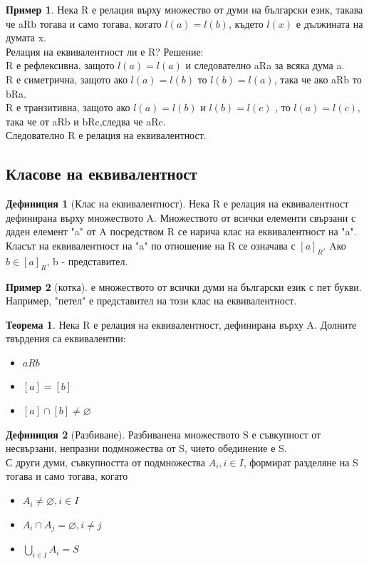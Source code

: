 \documentclass[fleqn, 12pt]{article}
\theoremstyle{definition}
\newtheorem{example}{Пример}[subsection]
\newtheorem{definition}{Дефиниция}[subsection]
\newtheorem{theorem}{Теорема}[subsection]
\begin{document}
\begin{example}
Нека R е релация върху множество от думи на български език, такава че aRb тогава и само тогава, когато $l(a) = l(b)$, където $l(x)$ е дължината на думата x.\\
Релация на еквивалентност ли е R?
Решение: \\
R е рефлексивна, защото $l(a) = l(a)$ и следователно aRa за всяка дума a.\\
R е симетрична, защото ако $l(a) = l(b)$ то $l(b) = l(a)$, така че ако aRb то bRa.\\
R е транзитивна, защото ако $l(a) = l(b)$ и $l(b) = l(c)$ , то $l(a) = l(c)$, така че от aRb и bRc,следва че aRc.\\
Следователно R е релация на еквивалентност.
\end{example}

\subsection{Класове на еквивалентност}

\begin{definition}[Клас на еквивалентност]
Нека R е релация на еквивалентност дефинирана върху множеството A. Множеството от всички елементи свързани с даден елемент "a"\! от A посредством R се нарича клас на еквивалентност на "a". \\
Класът на еквивалентност на "a" \! по отношение на R се означава с $[a]_R$.
Aко $b \in [a]_R$, b - представител.
\end{definition}

\begin{example}
[котка] е множеството от всички думи на български език с пет букви. Например, "петел" е представител на този клас на еквивалентност.
\end{example}

\begin{theorem}
Нека R е релация на еквивалентност, дефинирана върху A. Долните твърдения са еквивалентни:
\begin{itemize}
\item $aRb$
\item $[a] = [b]$
\item $[a] \cap [b] \neq \varnothing$
\end{itemize}
\end{theorem}

\begin{definition}[Разбиване]
Разбиванена множеството S е съвкупност от несвързани, непразни подмножества от S, чието обединение е S. \\
С други думи, съвкупността от подмножества $A_i, i\in I$, формират разделяне на S тогава и само тогава, когато

\begin{itemize}
\item $A_i \neq \varnothing, i \in I$
\item $A_i \cap A_j = \varnothing, i \neq j$
\item $\bigcup_{i \in I} A_i = S$
\end{itemize}

\end{definition}
\end{document}
